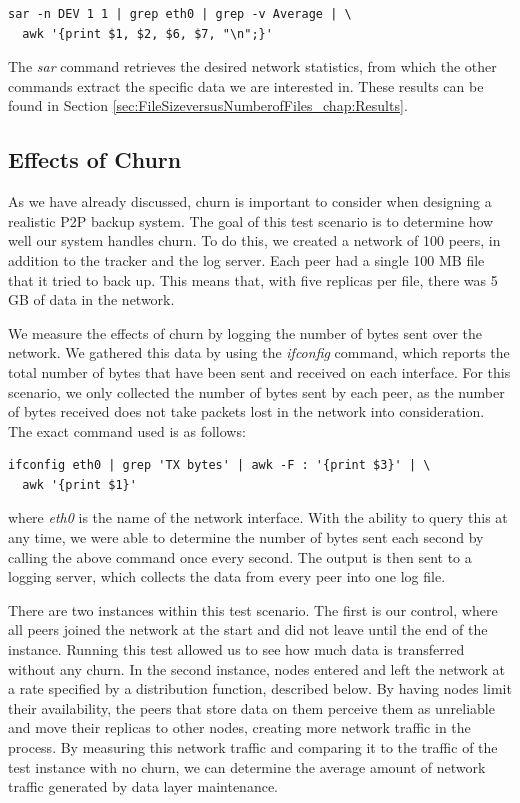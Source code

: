 \documentclass[12pt]{report}
\begin{document}
\begin{verbatim}
sar -n DEV 1 1 | grep eth0 | grep -v Average | \
  awk '{print $1, $2, $6, $7, "\n";}'
\end{verbatim}

The \textit{sar} command retrieves the desired network statistics, from which the other commands extract the specific data we are interested in. These results can be found in Section \ref{sec:FileSizeversusNumberofFiles_chap:Results}.

\subsection{Effects of Churn} \label{subsec:EffectsofChurn_sec:TestScenarios_chap:Methodology}

As we have already discussed, churn is important to consider when designing a realistic P2P backup system. The goal of this test scenario is to determine how well our system handles churn. To do this, we created a network of 100 peers, in addition to the tracker and the log server. Each peer had a single 100 MB file that it tried to back up. This means that, with five replicas per file, there was 5 GB of data in the network.

We measure the effects of churn by logging the number of bytes sent over the network. We gathered this data by using the \textit{ifconfig} command, which reports the total number of bytes that have been sent and received on each interface. For this scenario, we only collected the number of bytes sent by each peer, as the number of bytes received does not take packets lost in the network into consideration. The exact command used is as follows:

\begin{verbatim}
ifconfig eth0 | grep 'TX bytes' | awk -F : '{print $3}' | \
  awk '{print $1}'
\end{verbatim}

where \textit{eth0} is the name of the network interface. With the ability to query this at any time, we were able to determine the number of bytes sent each second by calling the above command once every second. The output is then sent to a logging server, which collects the data from every peer into one log file.

There are two instances within this test scenario. The first is our control, where all peers joined the network at the start and did not leave until the end of the instance. Running this test allowed us to see how much data is transferred without any churn. In the second instance, nodes entered and left the network at a rate specified by a distribution function, described below. By having nodes limit their availability, the peers that store data on them perceive them as unreliable and move their replicas to other nodes, creating more network traffic in the process. By measuring this network traffic and comparing it to the traffic of the test instance with no churn, we can determine the average amount of network traffic generated by data layer maintenance.
\end{document}
